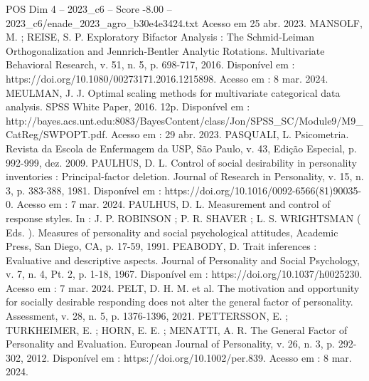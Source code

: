 \begin{textsample}{POS Dim 4 – 2023\_c6 – Score -8.00 – 2023\_c6/enade\_2023\_agro\_b30e4e3424.txt}
Acesso em 25 abr. 2023.
MANSOLF, M. ; REISE, S.
P.
Exploratory Bifactor Analysis : The Schmid-Leiman Orthogonalization and Jennrich-Bentler Analytic Rotations.
Multivariate Behavioral Research, v. 51, n. 5, p. 698-717, 2016.
Disponível em : https://doi.org/10.1080/00273171.2016.1215898.
Acesso em : 8 mar. 2024.
MEULMAN, J.
J.
Optimal scaling methods for multivariate categorical data analysis.
SPSS White Paper, 2016. 12p.
Disponível em : http://bayes.acs.unt.edu:8083/BayesContent/class/Jon/SPSS\_SC/Module9/M9\_CatReg/SWPOPT.pdf.
Acesso em : 29 abr. 2023.
PASQUALI, L.
Psicometria.
Revista da Escola de Enfermagem da USP, São Paulo, v. 43, Edição Especial, p. 992-999, dez. 2009.
PAULHUS, D.
L.
Control of social desirability in personality inventories : Principal-factor deletion.
Journal of Research in Personality, v. 15, n. 3, p. 383-388, 1981.
Disponível em : https://doi.org/10.1016/0092-6566(81)90035-0.
Acesso em : 7 mar. 2024.
PAULHUS, D.
L.
Measurement and control of response styles.
In : J.
P.
ROBINSON ; P.
R.
SHAVER ; L.
S.
WRIGHTSMAN ( Eds. ).
Measures of personality and social psychological attitudes, Academic Press, San Diego, CA, p. 17-59, 1991.
PEABODY, D.
Trait inferences : Evaluative and descriptive aspects.
Journal of Personality and Social Psychology, v. 7, n. 4, Pt. 2, p. 1-18, 1967.
Disponível em : https://doi.org/10.1037/h0025230.
Acesso em : 7 mar. 2024.
PELT, D.
H.
M. et al.
The motivation and opportunity for socially desirable responding does not alter the general factor of personality.
Assessment, v. 28, n. 5, p. 1376-1396, 2021.
PETTERSSON, E. ; TURKHEIMER, E. ; HORN, E.
E. ; MENATTI, A.
R.
The General Factor of Personality and Evaluation.
European Journal of Personality, v. 26, n. 3, p. 292-302, 2012.
Disponível em : https://doi.org/10.1002/per.839.
Acesso em : 8 mar. 2024.

\end{textsample}
